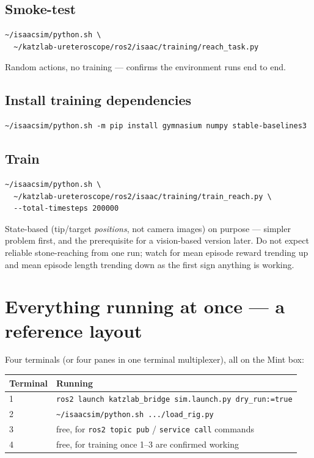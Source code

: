 \documentclass[11pt]{article}
\begin{document}
\subsection{Smoke-test}
\begin{lstlisting}
~/isaacsim/python.sh \
  ~/katzlab-ureteroscope/ros2/isaac/training/reach_task.py
\end{lstlisting}

Random actions, no training --- confirms the environment runs end to end.

\subsection{Install training dependencies}
\begin{lstlisting}
~/isaacsim/python.sh -m pip install gymnasium numpy stable-baselines3
\end{lstlisting}

\subsection{Train}
\begin{lstlisting}
~/isaacsim/python.sh \
  ~/katzlab-ureteroscope/ros2/isaac/training/train_reach.py \
  --total-timesteps 200000
\end{lstlisting}

State-based (tip/target \emph{positions}, not camera images) on purpose
--- simpler problem first, and the prerequisite for a vision-based
version later. Do not expect reliable stone-reaching from one run; watch
for mean episode reward trending up and mean episode length trending down
as the first sign anything is working.

\section{Everything running at once --- a reference layout}

Four terminals (or four panes in one terminal multiplexer), all on the
Mint box:

\begin{center}
\begin{tabular}{|l|l|}
\hline
\textbf{Terminal} & \textbf{Running} \\
\hline
1 & \texttt{ros2 launch katzlab\_bridge sim.launch.py dry\_run:=true} \\
2 & \texttt{\textasciitilde/isaacsim/python.sh .../load\_rig.py} \\
3 & free, for \texttt{ros2 topic pub} / \texttt{service call} commands \\
4 & free, for training once 1--3 are confirmed working \\
\hline
\end{tabular}
\end{center}
\end{document}
